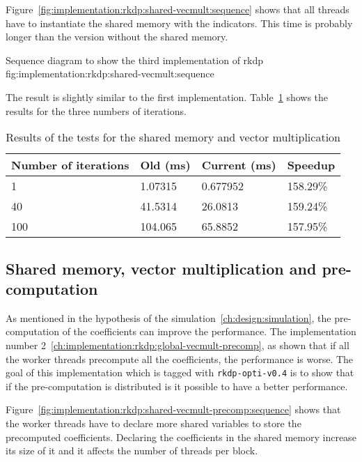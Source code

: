 Figure~\ref{fig:implementation:rkdp:shared-vecmult:sequence} shows that all
threads have to instantiate the shared memory with the indicators.
This time is probably longer than the version without the shared memory.

{Sequence diagram to show the third implementation of \acrshort{rkdp}}
{fig:implementation:rkdp:shared-vecmult:sequence}

The result is slightly similar to the first implementation.
Table~\ref{tab:implementation:rkdp:shared-vecmult:results} shows the results
for the three numbers of iterations.

\begin{table}[ht]
    \centering
    \begin{tabular}{|l|l|l|l|}
        \hline
        \textbf{Number of iterations} & \textbf{Old (ms)} & \textbf{Current (ms)} & \textbf{Speedup} \\
        \hline
        1 & 1.07315 & 0.677952 & 158.29\% \\
        \hline
        40 & 41.5314 & 26.0813 & 159.24\% \\
        \hline
        100 & 104.065 & 65.8852 & 157.95\% \\
        \hline
    \end{tabular}
    \caption{Results of the tests for the shared memory and vector multiplication}
    \label{tab:implementation:rkdp:shared-vecmult:results}
\end{table}

\subsection{Shared memory, vector multiplication and pre-computation}
\label{ch:implementation:rkdp:shared-vecmult-precomp}

As mentioned in the hypothesis of the simulation~\ref{ch:design:simulation}, the
pre-computation of the coefficients can improve the performance.
The implementation number 2~\ref{ch:implementation:rkdp:global-vecmult-precomp},
as shown that if all the worker threads precompute all the coefficients, the
performance is worse.
The goal of this implementation which is tagged with \texttt{rkdp-opti-v0.4} is
to show that if the pre-computation is distributed is it possible to have a
better performance.

Figure~\ref{fig:implementation:rkdp:shared-vecmult-precomp:sequence} shows that
the worker threads have to declare more shared variables to store the
precomputed coefficients.
Declaring the coefficients in the shared memory increase its size of it and it
affects the number of threads per block.

